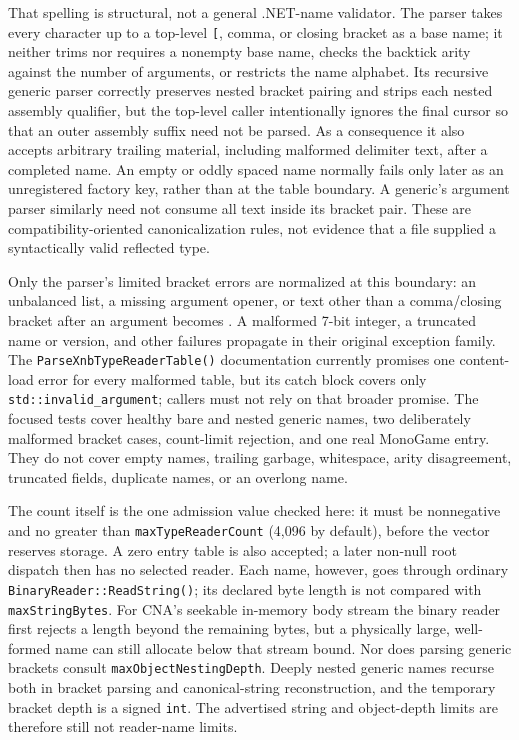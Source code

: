 That spelling is structural, not a general .NET-name validator. The parser takes every character
up to a top-level \texttt{[}, comma, or closing bracket as a base name; it neither trims nor
requires a nonempty base name, checks the backtick arity against the number of arguments, or
restricts the name alphabet. Its recursive generic parser correctly preserves nested bracket
pairing and strips each nested assembly qualifier, but the top-level caller intentionally ignores
the final cursor so that an outer assembly suffix need not be parsed. As a consequence it also
accepts arbitrary trailing material, including malformed delimiter text, after a completed name.
An empty or oddly spaced name normally fails only later as an unregistered factory key, rather
than at the table boundary. A generic's argument parser similarly need not consume all text
inside its bracket pair. These are compatibility-oriented canonicalization rules, not evidence
that a file supplied a syntactically valid reflected type.

Only the parser's limited bracket errors are normalized at this boundary: an unbalanced list, a
missing argument opener, or text other than a comma/closing bracket after an argument becomes
. A malformed 7-bit integer, a truncated name or version, and
other  failures propagate in their original exception family. The
\texttt{ParseXnbTypeReaderTable()} documentation currently promises one content-load error for
every malformed table, but its catch block covers only \texttt{std::invalid\_argument}; callers
must not rely on that broader promise. The focused tests cover healthy bare and nested generic
names, two deliberately malformed bracket cases, count-limit rejection, and one real MonoGame
entry. They do not cover empty names, trailing garbage, whitespace, arity disagreement, truncated
fields, duplicate names, or an overlong name.

The count itself is the one admission value checked here: it must be nonnegative and no greater
than \texttt{maxTypeReaderCount} (4,096 by default), before the vector reserves storage. A zero
entry table is also accepted; a later non-null root dispatch then has no selected reader. Each
name, however, goes through ordinary \texttt{BinaryReader::ReadString()}; its declared byte
length is not compared with \texttt{maxStringBytes}. For CNA's seekable in-memory body stream
the binary reader first rejects a length beyond the remaining bytes, but a physically large,
well-formed name can still allocate below that stream bound. Nor does parsing generic brackets
consult \texttt{maxObjectNestingDepth}. Deeply nested generic names recurse both in bracket
parsing and canonical-string reconstruction, and the temporary bracket depth is a signed
\texttt{int}. The advertised string and object-depth limits are therefore still not reader-name
limits.

